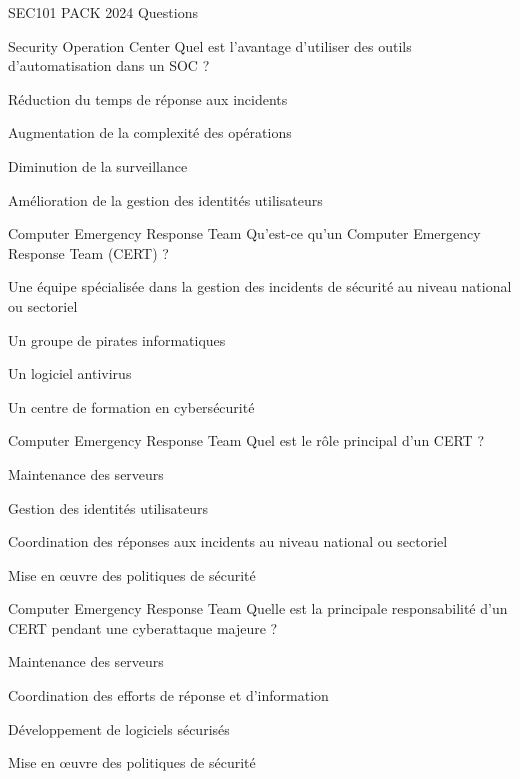 \documentclass[12pt]{article}
\begin{document}
\begin{quiz}{SEC101 PACK 2024 Questions}
     \begin{multi}[points=1]{Security Operation Center}
     Quel est l'avantage d'utiliser des outils d'automatisation dans un SOC ?
        \item *Réduction du temps de réponse aux incidents
        \item Augmentation de la complexité des opérations
        \item Diminution de la surveillance
        \item Amélioration de la gestion des identités utilisateurs
      \end{multi} 
    
     \begin{multi}[points=1]{Computer Emergency Response Team}
    Qu'est-ce qu'un Computer Emergency Response Team (CERT) ?
        \item *Une équipe spécialisée dans la gestion des incidents de sécurité au niveau national ou sectoriel
        \item Un groupe de pirates informatiques
        \item Un logiciel antivirus
        \item Un centre de formation en cybersécurité
      \end{multi} 
    
     \begin{multi}[points=1]{Computer Emergency Response Team}
     Quel est le rôle principal d'un CERT ?
        \item Maintenance des serveurs
        \item Gestion des identités utilisateurs
        \item *Coordination des réponses aux incidents au niveau national ou sectoriel
        \item Mise en œuvre des politiques de sécurité
      \end{multi} 
    
     \begin{multi}[points=1]{Computer Emergency Response Team}
     Quelle est la principale responsabilité d'un CERT pendant une cyberattaque majeure ?
        \item Maintenance des serveurs
        \item *Coordination des efforts de réponse et d'information
        \item Développement de logiciels sécurisés
        \item Mise en œuvre des politiques de sécurité
      \end{multi} 
    

\end{quiz}
\end{document}

